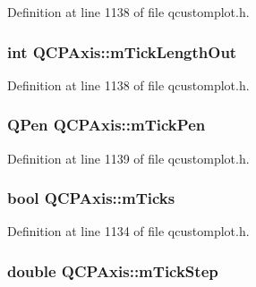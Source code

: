 Definition at line 1138 of file qcustomplot.\-h.

\hypertarget{class_q_c_p_axis_a2951f26d8a504d330157e05063513809}{
\subsubsection[{m\-Tick\-Length\-Out}]{\setlength{\rightskip}{0pt plus 5cm}int Q\-C\-P\-Axis\-::m\-Tick\-Length\-Out\hspace{0.3cm}{\ttfamily [protected]}}}\label{class_q_c_p_axis_a2951f26d8a504d330157e05063513809}


Definition at line 1138 of file qcustomplot.\-h.

\hypertarget{class_q_c_p_axis_a1d52c78c856d8bd1f331d4ec4e63d944}{
\subsubsection[{m\-Tick\-Pen}]{\setlength{\rightskip}{0pt plus 5cm}Q\-Pen Q\-C\-P\-Axis\-::m\-Tick\-Pen\hspace{0.3cm}{\ttfamily [protected]}}}\label{class_q_c_p_axis_a1d52c78c856d8bd1f331d4ec4e63d944}


Definition at line 1139 of file qcustomplot.\-h.

\hypertarget{class_q_c_p_axis_ab111e74bba22e06848897c932fc549fe}{
\subsubsection[{m\-Ticks}]{\setlength{\rightskip}{0pt plus 5cm}bool Q\-C\-P\-Axis\-::m\-Ticks\hspace{0.3cm}{\ttfamily [protected]}}}\label{class_q_c_p_axis_ab111e74bba22e06848897c932fc549fe}


Definition at line 1134 of file qcustomplot.\-h.

\hypertarget{class_q_c_p_axis_a4fe96830fc5a2711e20fe5edccfe2ed3}{
\subsubsection[{m\-Tick\-Step}]{\setlength{\rightskip}{0pt plus 5cm}double Q\-C\-P\-Axis\-::m\-Tick\-Step\hspace{0.3cm}{\ttfamily [protected]}}}\label{class_q_c_p_axis_a4fe96830fc5a2711e20fe5edccfe2ed3}


